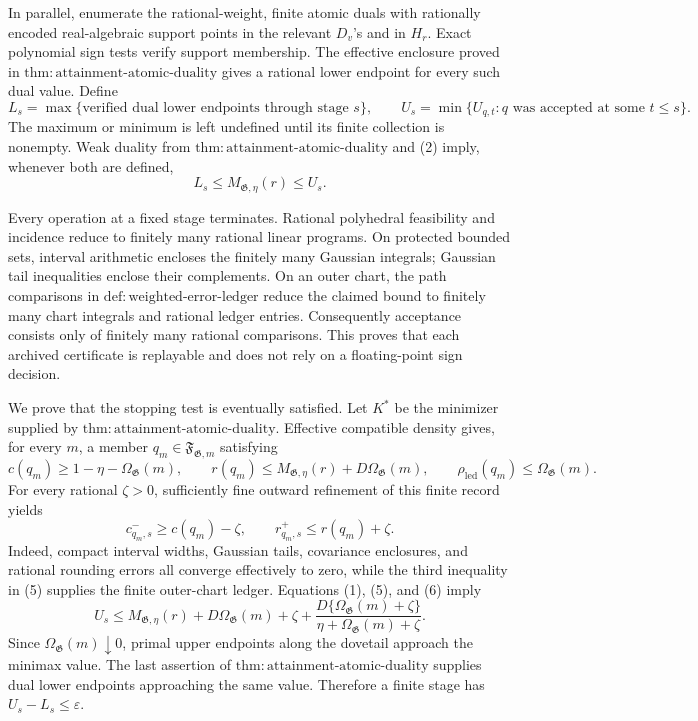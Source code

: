 In parallel, enumerate the rational-weight, finite atomic duals with
rationally encoded real-algebraic support points in the relevant \(D_v\)'s
and in \(H_r\).  Exact polynomial sign tests verify support membership.
The effective enclosure proved in
\(\mathrm{thm:attainment\mbox{-}atomic\mbox{-}duality}\) gives a rational
lower endpoint for every such dual value.  Define
\[
 L_s=\max\{\text{verified dual lower endpoints through stage }s\},
 \qquad
 U_s=\min\{U_{q,t}:q\text{ was accepted at some }t\leq s\}.
\tag{3}
\]
The maximum or minimum is left undefined until its finite collection is
nonempty.  Weak duality from
\(\mathrm{thm:attainment\mbox{-}atomic\mbox{-}duality}\) and (2) imply,
whenever both are defined,
\[
 L_s\leq M_{\mathfrak G,\eta}(r)\leq U_s.
\tag{4}
\]

Every operation at a fixed stage terminates.  Rational polyhedral
feasibility and incidence reduce to finitely many rational linear programs.
On protected bounded sets, interval arithmetic encloses the finitely many
Gaussian integrals; Gaussian tail inequalities enclose their complements.
On an outer chart, the path comparisons in
\(\mathrm{def:weighted\mbox{-}error\mbox{-}ledger}\) reduce the claimed
bound to finitely many chart integrals and rational ledger entries.
Consequently acceptance consists only of finitely many rational
comparisons.  This proves that each archived certificate is replayable and
does not rely on a floating-point sign decision.

We prove that the stopping test is eventually satisfied.  Let \(K^*\) be
the minimizer supplied by
\(\mathrm{thm:attainment\mbox{-}atomic\mbox{-}duality}\).  Effective
compatible density gives, for every \(m\), a member
\(q_m\in\mathfrak F_{\mathfrak G,m}\) satisfying
\[
 c(q_m)\geq1-\eta-\Omega_{\mathfrak G}(m),\qquad
 r(q_m)\leq M_{\mathfrak G,\eta}(r)+D\Omega_{\mathfrak G}(m),\qquad
 \rho_{\mathrm{led}}(q_m)\leq\Omega_{\mathfrak G}(m).
\tag{5}
\]
For every rational \(\zeta>0\), sufficiently fine outward refinement of
this finite record yields
\[
 c^-_{q_m,s}\geq c(q_m)-\zeta,\qquad
 r^+_{q_m,s}\leq r(q_m)+\zeta.
\tag{6}
\]
Indeed, compact interval widths, Gaussian tails, covariance enclosures,
and rational rounding errors all converge effectively to zero, while the
third inequality in (5) supplies the finite outer-chart ledger.  Equations
(1), (5), and (6) imply
\[
 U_s\leq M_{\mathfrak G,\eta}(r)
 +D\Omega_{\mathfrak G}(m)+\zeta
 +\frac{D\{\Omega_{\mathfrak G}(m)+\zeta\}}
 {\eta+\Omega_{\mathfrak G}(m)+\zeta}.
\tag{7}
\]
Since \(\Omega_{\mathfrak G}(m)\downarrow0\), primal upper endpoints along
the dovetail approach the minimax value.  The last assertion of
\(\mathrm{thm:attainment\mbox{-}atomic\mbox{-}duality}\) supplies dual lower
endpoints approaching the same value.  Therefore a finite stage has
\(U_s-L_s\leq\varepsilon\).

